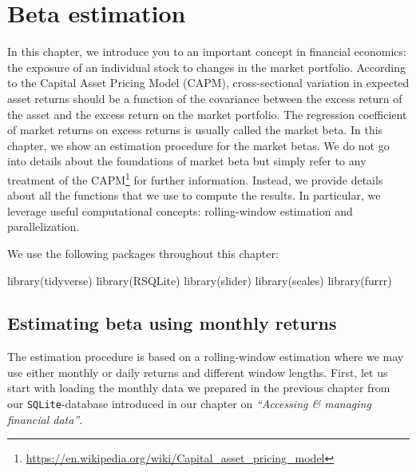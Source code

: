 \documentclass[
]{krantz}
\newenvironment{Shaded}{\begin{snugshade}}{\end{snugshade}}
\newcommand{\FunctionTok}[1]{\textcolor[rgb]{0,0,0}{#1}}
\newcommand{\NormalTok}[1]{#1}
\renewcommand{\href}[2]{#2\footnote{\url{#1}}}
\begin{document}
\hypertarget{beta-estimation}{%
\chapter{Beta estimation}\label{beta-estimation}}

In this chapter, we introduce you to an important concept in financial economics: the exposure of an individual stock to changes in the market portfolio. According to the Capital Asset Pricing Model (CAPM), cross-sectional variation in expected asset returns should be a function of the covariance between the excess return of the asset and the excess return on the market portfolio. The regression coefficient of market returns on excess returns is usually called the market beta.
In this chapter, we show an estimation procedure for the market betas. We do not go into details about the foundations of market beta but simply refer to any treatment of the \href{https://en.wikipedia.org/wiki/Capital_asset_pricing_model}{CAPM} for further information. Instead, we provide details about all the functions that we use to compute the results. In particular, we leverage useful computational concepts: rolling-window estimation and parallelization.

We use the following packages throughout this chapter:

\begin{Shaded}
\begin{Highlighting}[]
\FunctionTok{library}\NormalTok{(tidyverse)}
\FunctionTok{library}\NormalTok{(RSQLite)}
\FunctionTok{library}\NormalTok{(slider)}
\FunctionTok{library}\NormalTok{(scales)}
\FunctionTok{library}\NormalTok{(furrr)}
\end{Highlighting}
\end{Shaded}

\hypertarget{estimating-beta-using-monthly-returns}{%
\section{Estimating beta using monthly returns}\label{estimating-beta-using-monthly-returns}}

The estimation procedure is based on a rolling-window estimation where we may use either monthly or daily returns and different window lengths. First, let us start with loading the monthly data we prepared in the previous chapter from our \texttt{SQLite}-database introduced in our chapter on \emph{``Accessing \& managing financial data''}.
\end{document}
